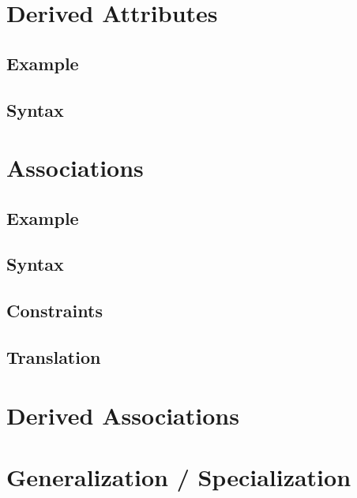 \documentclass[a4paper,oneside,12pt, extrafontsizes]{memoir}
\begin{document}
\chapter{Derived Attributes}
\label{ch:derived-attributes}


\section{Example}


\section{Syntax}


\chapter{Associations}
\label{ch:associations}


\section{Example}


\section{Syntax}


\section{Constraints}


\section{Translation}


\chapter{Derived Associations}
\label{ch:derived-associations}


\chapter{Generalization / Specialization}
\label{ch:generalization}

\end{document}
